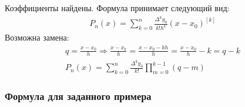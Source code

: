 Коэффициенты найдены. Формула принимает следующий вид:
\begin{align}
	P_n(x) = \sum_{k=0}^n \frac{\Delta^k y_0}{k!h^k} (x-x_0)^{[k]}
\end{align}
Возможна замена:
\begin{align}
	q = \frac{x-x_0}{h} \Longrightarrow \frac{x-x_k}{h} = \frac{x-x_0-kh}{h} = \frac{x-x_0}{h} - k = q - k \\
	P_n(x) = \sum_{k=0}^n \frac{\Delta^k y_0}{k!}\prod_{m=0}^{k-1}(q-m)
\end{align}
\subsubsection{Формула для заданного примера}


